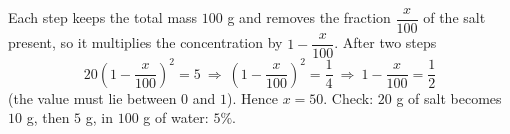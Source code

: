 Each step keeps the total mass $100$ g and removes the fraction $\dfrac{x}{100}$ of the salt present, so it multiplies the concentration by $1-\dfrac{x}{100}$. After two steps
\[
20\left(1-\dfrac{x}{100}\right)^2=5\ \Longrightarrow\ \left(1-\dfrac{x}{100}\right)^2=\dfrac{1}{4}\ \Longrightarrow\ 1-\dfrac{x}{100}=\dfrac{1}{2}
\]
(the value must lie between $0$ and $1$). Hence $x=\boxed{50}$. Check: $20$ g of salt becomes $10$ g, then $5$ g, in $100$ g of water: $5\%$.
